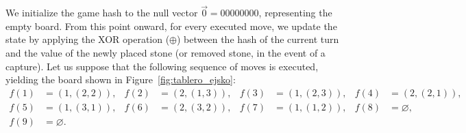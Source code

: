 We initialize the game hash to the null vector \(\vec{0} = 00000000\), representing the empty board. From this point onward, for every executed move, we update the state by applying the XOR operation (\(\oplus\)) between the hash of the current turn and the value of the newly placed stone (or removed stone, in the event of a capture). Let us suppose that the following sequence of moves is executed, yielding the board shown in Figure~\ref{fig:tablero_ejsko}:
 \begin{align*}
	f(1)&=(1,(2,2)), &f(2)&=(2,(1,3)),	&f(3)&=(1,(2,3)), &f(4)&=(2,(2,1)),\\
	f(5)&=(1,(3,1)), &f(6)&=(2,(3,2)), &f(7)&=(1,(1,2)), &f(8)&=\varnothing,\\
	f(9)&=\varnothing. 
\end{align*} 

